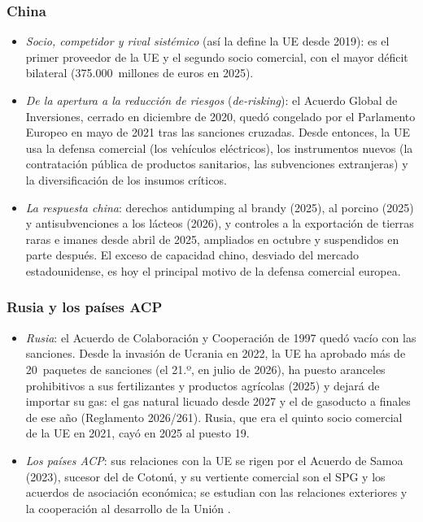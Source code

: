 \documentclass[11pt]{article}
\begin{document}
\subsubsection{China}\label{sec:china}

\begin{itemize}
\item \emph{Socio, competidor y rival sistémico} (así la define la UE desde 2019): es el primer proveedor de la UE y el segundo socio comercial, con el mayor déficit bilateral (375.000~millones de euros en 2025).
\item \emph{De la apertura a la reducción de riesgos} (\emph{de-risking}): el Acuerdo Global de Inversiones, cerrado en diciembre de 2020, quedó congelado por el Parlamento Europeo en mayo de 2021 tras las sanciones cruzadas. Desde entonces, la UE usa la defensa comercial (los vehículos eléctricos), los instrumentos nuevos (la contratación pública de productos sanitarios, las subvenciones extranjeras) y la diversificación de los insumos críticos.
\item \emph{La respuesta china}: derechos antidumping al brandy (2025), al porcino (2025) y antisubvenciones a los lácteos (2026), y controles a la exportación de tierras raras e imanes desde abril de 2025, ampliados en octubre y suspendidos en parte después\nocite{EPRS2025TierrasRaras}. El exceso de capacidad chino, desviado del mercado estadounidense, es hoy el principal motivo de la defensa comercial europea.
\end{itemize}

\subsubsection{Rusia y los países ACP}\label{sec:rusia}

\begin{itemize}
\item \emph{Rusia}: el Acuerdo de Colaboración y Cooperación de 1997 quedó vacío con las sanciones. Desde la invasión de Ucrania en 2022, la UE ha aprobado más de 20~paquetes de sanciones (el 21.º, en julio de 2026)\nocite{CONS2026Sanciones21}, ha puesto aranceles prohibitivos a sus fertilizantes y productos agrícolas (2025) y dejará de importar su gas: el gas natural licuado desde 2027 y el de gasoducto a finales de ese año (Reglamento 2026/261)\nocite{UE2026Gas}. Rusia, que era el quinto socio comercial de la UE en 2021, cayó en 2025 al puesto 19\nocite{Eurostat2026Socios}.
\item \emph{Los países ACP}: sus relaciones con la UE se rigen por el Acuerdo de Samoa (2023), sucesor del de Cotonú, y su vertiente comercial son el SPG y los acuerdos de asociación económica; se estudian con las relaciones exteriores y la cooperación al desarrollo de la Unión .
\end{itemize}
\end{document}
